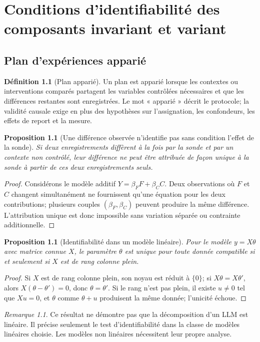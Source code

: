 \documentclass[11pt,oneside]{book}
\newtheorem{proposition}[theoreme]{Proposition}
\theoremstyle{definition}
\newtheorem{definition}[theoreme]{Définition}
\theoremstyle{remark}
\newtheorem{remarque}[theoreme]{Remarque}
\newcommand{\1}{\mathbf 1}
\begin{document}
\chapter{Conditions d'identifiabilité des composants invariant et variant}
\section{Plan d'expériences apparié}
\begin{definition}[Plan apparié]
Un plan est apparié lorsque les contextes ou interventions comparés partagent les variables contrôlées nécessaires et que les différences restantes sont enregistrées. Le mot « apparié » décrit le protocole; la validité causale exige en plus des hypothèses sur l'assignation, les confondeurs, les effets de report et la mesure.
\end{definition}
\begin{proposition}[Une différence observée n'identifie pas sans condition l'effet de la sonde]
Si deux enregistrements diffèrent à la fois par la sonde et par un contexte non contrôlé, leur différence ne peut être attribuée de façon unique à la sonde à partir de ces deux enregistrements seuls.
\end{proposition}
\begin{proof}
Considérons le modèle additif \(Y=\beta_F F+\beta_C C\). Deux observations où \(F\) et \(C\) changent simultanément ne fournissent qu'une équation pour les deux contributions; plusieurs couples \((\beta_F,\beta_C)\) peuvent produire la même différence. L'attribution unique est donc impossible sans variation séparée ou contrainte additionnelle.\end{proof}
\begin{proposition}[Identifiabilité dans un modèle linéaire]
Pour le modèle \(y=X\theta\) avec matrice connue \(X\), le paramètre \(\theta\) est unique pour toute donnée compatible si et seulement si \(X\) est de rang colonne plein.
\end{proposition}
\begin{proof}
Si \(X\) est de rang colonne plein, son noyau est réduit à \(\{0\}\); si \(X\theta=X\theta'\), alors \(X(\theta-\theta')=0\), donc \(\theta=\theta'\). Si le rang n'est pas plein, il existe \(u\ne0\) tel que \(Xu=0\), et \(\theta\) comme \(\theta+u\) produisent la même donnée; l'unicité échoue.\end{proof}
\begin{remarque}
Ce résultat ne démontre pas que la décomposition d'un LLM est linéaire. Il précise seulement le test d'identifiabilité dans la classe de modèles linéaires choisie. Les modèles non linéaires nécessitent leur propre analyse.
\end{remarque}
\end{document}
